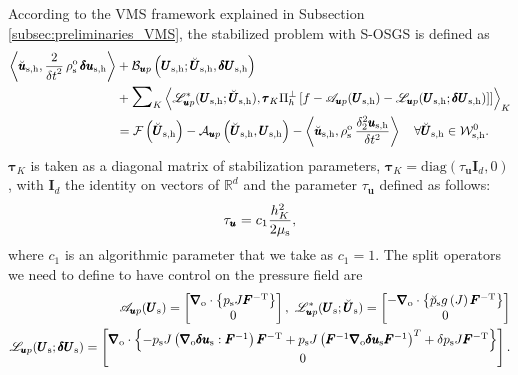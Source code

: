 \documentclass[11pt,english]{article}
\def\psolid{p_{\rm{s}}}                         %
\def\unknosolid{\pmb{U}_{\rm{s}}}               %
\def\testpsolid{\breve{p}_{\rm{s}}}             %
\def\testsolid{\breve{\pmb{U}}_{\rm{s}}}        %
\def\usolidinc{\pmb{\delta u}_{\rm{s}}}                   %
\def\psolidinc{\delta p_{\rm{s}}}                         %
\def\unknosolidinc{\pmb{\delta U}_{\rm{s}}}               %
\def\usolidh{\pmb{u}_{\rm{s},\rm{h}}}                    %
\def\unknosolidh{\pmb{U}_{\rm{s},\rm{h}}}                %
\def\testusolidh{\breve{\pmb{u}}_{\rm{s},\rm{h}}}       %
\def\testsolidh{\breve{\pmb{U}}_{\rm{s},\rm{h}}}        %
\def\usolidinch{\pmb{\delta u}_{\rm{s},\rm{h}}}           %
\def\unknosolidinch{\pmb{\delta U}_{\rm{s},\rm{h}}}       %
\def\testsolidspaceh{\mathcal{W}_{\rm{s},\rm{h}}^{0}}     %
\def\u{{\pmb u}}                            %
\def\invF{\pmb{F}^{-1}}                     %
\def\invFtrans{\pmb{F}^{-\rm{T}}}           %
\def\grad{\pmb{\nabla}_{\rm{o}}}        %
\def\div{\grad \cdot}                   %
\def\denssolid{\rho_{\rm{s}}^{\rm{o}}}  %
\def\musolid{\mu_{\rm{s}}}              %
\def\up{\pmb{u} p}
\def\dt{{\delta t}}                                     %
\def\BDFduhdt2{\frac{\delta_2^2 \usolidh}{\delta t^2}}    %
\begin{document}
According to the VMS framework explained in Subsection \ref{subsec:preliminaries_VMS}, the stabilized problem with S-OSGS is defined as
\begin{align*}
      \left \langle \testusolidh , \frac{2}{\dt^2}\, \denssolid \, \usolidinch \right \rangle &+ \mathcal{B}_{\up} \left ( \unknosolidh; \testsolidh, \unknosolidinch \right) \\
      &+ \scalebox{1.6}{$\sum$}_K  \left \langle  {\mathscr L}_{\up}^\ast (\unknosolidh ; \testsolidh ) , \pmb{\tau}_{K} {\Pi_h^\bot} \left [ f - {\mathscr A}_{\up}(\unknosolidh) - {\mathscr L}_{\up} (\unknosolidh ;\unknosolidinch)  ] \right] \right \rangle_K  \nonumber \\  
     &= \mathcal{F} \left ( \testsolidh  \right) -  \mathcal{A}_{\up} \left ( \testsolidh , \unknosolidh \right) - \left \langle \testusolidh, \denssolid \, \BDFduhdt2 \right \rangle \quad \forall \testsolidh \in \testsolidspaceh. 
\label{eq:linearized_spatial_discretized_stabilized_up}
\end{align*}
$\pmb{\tau}_K$ is taken as a diagonal matrix of stabilization parameters, $\pmb{\tau}_K=\text{diag}\left(\tau_{\u}\pmb{I}_{d},0\right)$, with $\pmb{I}_{d}$ the identity on vectors of $\mathbb{R}^{d}$ and the parameter $\tau_{\pmb{u}}$ defined as follows:
\begin{equation*}
     \tau_{\pmb{u}} = c_1 \frac{h_K^2}{2\musolid} \label{eq:stabilization_parameter_up},
\end{equation*}
where $c_1$ is an algorithmic parameter that we take as $c_1 = 1$. The split operators we need to define to have control on the pressure field are
\begin{align*}
    {\mathscr A}_{\up}(\unknosolid) = \begin{bmatrix}
    \div \left \lbrace \psolid J \invFtrans \right \rbrace \\
    0
\end{bmatrix}, ~ {\mathscr L}_{\up}^\ast (\unknosolid ; \testsolid ) = \begin{bmatrix}
   -\div \left \lbrace \testpsolid g \left(J \right) \invFtrans \right \rbrace \\
    0
\end{bmatrix} \nonumber \\
{\mathscr L}_{\up} (\unknosolid ;\unknosolidinc) = \begin{bmatrix}
    \div \left \lbrace - \psolid J \left ( \grad \usolidinc : \invF \right ) \invFtrans + \psolid J \left ( \invF \grad \usolidinc \invF \right )^T +  \psolidinc J \invFtrans \right \rbrace \\
    0
\end{bmatrix}.
\end{align*}
\end{document}
